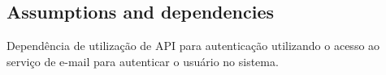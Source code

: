 \subsection{Assumptions and dependencies}
Dependência de utilização de API para autenticação utilizando o acesso ao serviço de e-mail para autenticar o usuário no sistema.